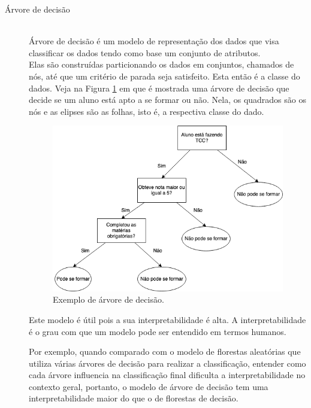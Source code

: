 \begin{description}
    \item[Árvore de decisão] \hfill \\ Árvore de decisão é um modelo de representação 
    dos dados que visa classificar os dados tendo como base um conjunto 
    de atributos. \\ 
    Elas são construídas particionando os dados em conjuntos, chamados de nós, 
    até que um critério de parada seja satisfeito. Esta então é a classe do dados. 
    Veja na Figura \ref{fig:ex_decision_tree} em que é mostrada uma árvore de 
    decisão que decide se um aluno está apto a se formar ou não. Nela, os quadrados 
    são os nós e as elipses são as folhas, isto é, a respectiva classe do dado.
    \begin{figure}
        \centering
        \includegraphics[width=.8\textwidth]{figuras/ex_decicion_tree1.png}
        \caption{Exemplo de árvore de decisão.\label{fig:ex_decision_tree}}
    \end{figure}

    Este modelo é útil pois a sua interpretabilidade é alta. A interpretabilidade é o grau com que 
    um modelo pode ser entendido em termos humanos. 
    
    Por exemplo, quando comparado com o modelo de florestas aleatórias que utiliza várias 
    árvores de decisão para realizar a classificação, entender como cada árvore influencia 
    na classificação final dificulta a interpretabilidade no contexto geral, portanto,
    o modelo de árvore de decisão tem uma interpretabilidade maior do que o de florestas de decisão.


\end{description}
